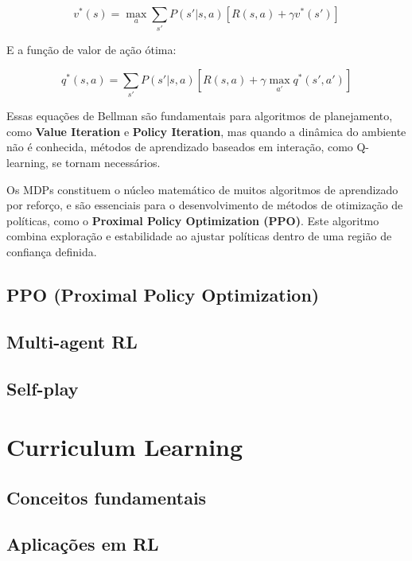 \[
v^*(s) = \max_a \sum_{s'} P(s'|s, a) \left[ R(s, a) + \gamma v^*(s') \right]
\]

E a função de valor de ação ótima:

\[
q^*(s, a) = \sum_{s'} P(s'|s, a) \left[ R(s, a) + \gamma \max_{a'} q^*(s', a') \right]
\]

Essas equações de Bellman são fundamentais para algoritmos de planejamento, como \textbf{Value Iteration} e \textbf{Policy Iteration}, mas quando a dinâmica do ambiente não é conhecida, métodos de aprendizado baseados em interação, como Q-learning, se tornam necessários.

Os MDPs constituem o núcleo matemático de muitos algoritmos de aprendizado por reforço, e são essenciais para o desenvolvimento de métodos de otimização de políticas, como o \textbf{Proximal Policy Optimization (PPO)}. Este algoritmo combina exploração e estabilidade ao ajustar políticas dentro de uma região de confiança definida.

\subsection{PPO (Proximal Policy Optimization)}
\label{subsec:ppo}

\subsection{Multi-agent RL}
\label{subsec:marl}

\subsection{Self-play}
\label{subsec:self_play}

\section{Curriculum Learning}
\label{sec:curriculum}

\subsection{Conceitos fundamentais}
\label{subsec:curriculum_conceitos}

\subsection{Aplicações em RL}
\label{subsec:curriculum_rl}

